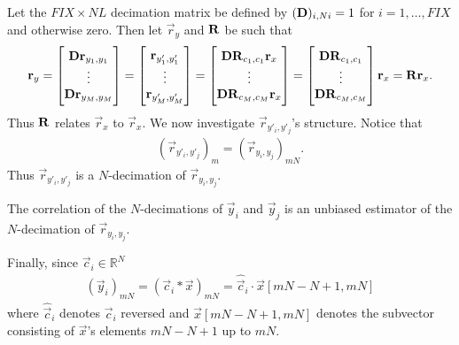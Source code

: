 \documentclass[a4paper, openany, oneside]{memoir}
\begin{document}
Let the $FIX\times NL$ decimation matrix be defined by $(\boldsymbol{\mathbf{D}})_{i,Ni} = 1$ for $i=1,\ldots,FIX$ and otherwise zero. Then let $\vec{r}_y$ and $\boldsymbol{\mathbf{R}}$ be such that
\begin{align*}
    \boldsymbol{\mathbf{r}}_y
    = \begin{bmatrix}
        \boldsymbol{\mathbf{D}}\boldsymbol{\mathbf{r}}_{y_1,y_1} \\
        \vdots \\
        \boldsymbol{\mathbf{D}}\boldsymbol{\mathbf{r}}_{y_M,y_M}
    \end{bmatrix}
    = \begin{bmatrix}
        \boldsymbol{\mathbf{r}}_{y'_1,y'_1} \\
        \vdots \\
        \boldsymbol{\mathbf{r}}_{y'_M,y'_M}
    \end{bmatrix}
    = \begin{bmatrix}
        \boldsymbol{\mathbf{D}}\boldsymbol{\mathbf{R}}_{c_1,c_1} \boldsymbol{\mathbf{r}}_x \\
        \vdots \\
        \boldsymbol{\mathbf{D}}\boldsymbol{\mathbf{R}}_{c_M,c_M} \boldsymbol{\mathbf{r}}_x
    \end{bmatrix}
    = \begin{bmatrix}
        \boldsymbol{\mathbf{D}}\boldsymbol{\mathbf{R}}_{c_1,c_1}\\
        \vdots \\
        \boldsymbol{\mathbf{D}}\boldsymbol{\mathbf{R}}_{c_M,c_M}
    \end{bmatrix} \boldsymbol{\mathbf{r}}_x
    = \boldsymbol{\mathbf{R}} \boldsymbol{\mathbf{r}}_x.
\end{align*}
Thus $\boldsymbol{\mathbf{R}}$ relates $\vec{r}_x$ to $\vec{r}_x$. We now investigate $\vec{r}_{y'_i,y'_j}$'s structure. Notice that
\begin{align*}
    (\vec{r}_{y'_i,y'_j})_m = (\vec{r}_{y_i,y_j})_{mN}.
\end{align*}
Thus $\vec{r}_{y'_i,y'_j}$ is a $N$-decimation of $\vec{r}_{y_i,y_j}$.
\begin{theorem} \label{th:deci-corr}
   The correlation of the $N$-decimations of $\vec{y}_i$ and $\vec{y}_j$ is an unbiased estimator of the $N$-decimation of $\vec{r}_{y_i,y_j}$.
\end{theorem}
Finally, since $\vec{c}_i \in \mathbb{R}^N$
\begin{align*}
    (\vec{y}_i)_{mN} = (\vec{c}_i \ast \vec{x})_{mN} = \hat{\vec{c}}_i \cdot \vec{x}[mN-N+1,mN]
\end{align*}
where $\hat{\vec{c}}_i$ denotes $\vec{c}_i$ reversed and $\vec{x}[mN-N+1,mN]$ denotes the subvector consisting of $\vec{x}$'s elements $mN-N+1$ up to $mN$.
\end{document}
